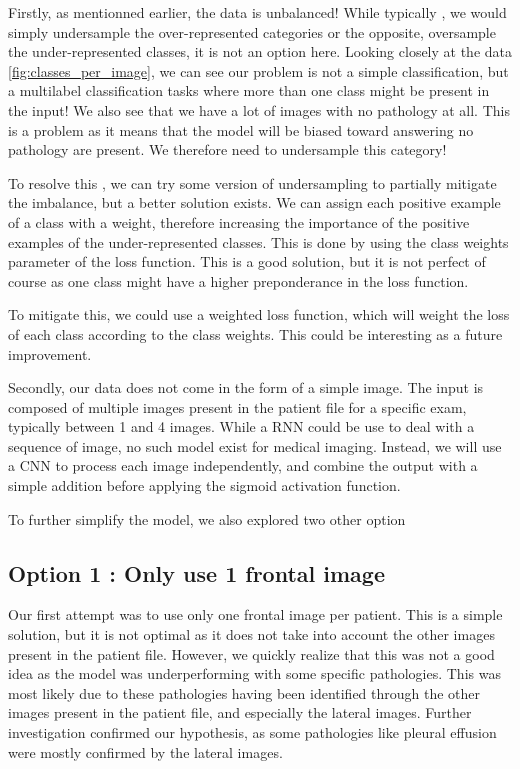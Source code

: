 \documentclass[11pt]{article}
\begin{document}
    Firstly, as mentionned earlier, the data is unbalanced! While typically , we would simply undersample the over-represented
    categories or the opposite, oversample the under-represented classes, it is not an option here. Looking closely at the data \ref{fig:classes_per_image},
    we can see our problem is not a simple classification, but a multilabel classification tasks where more than one class might be present
    in the input! We also see that we have a lot of images with no pathology at all. This is a problem as it means that the model will be biased toward answering no pathology are present. We therefore need to undersample this category!



    To resolve this , we can try some version of undersampling to partially mitigate the imbalance, but a better solution exists. We can assign each positive example
    of a class with a weight, therefore increasing the importance of the positive examples of the under-represented classes. This is
    done by using the class weights parameter of the loss function. This is a good solution, but it is not perfect of course as one class might have a higher preponderance in the loss
    function.

    To mitigate this, we could use a weighted loss function, which will weight the loss of each class according to the class weights. This could be interesting as a future improvement.


    Secondly, our data does not come in the form of a simple image. The input is composed of multiple images present in the patient file for a specific exam, typically between 1 and 4 images. While a RNN could be use to deal
    with a sequence of image, no such model exist for medical imaging. Instead, we will use a CNN to process each image independently, and combine the output with a simple addition before applying the sigmoid activation function.

    To further simplify the model, we also explored two other option

    \subsection{Option 1 : Only use 1 frontal image}
        Our first attempt was to use only one frontal image per patient. This is a simple solution, but it is not optimal as it does not take into account the other images present in the patient file.
        However, we quickly realize that this was not a good idea as the model was underperforming with some specific pathologies. This was most
        likely due to these pathologies having been identified through the other images present in the patient file, and especially the lateral images.
        Further investigation confirmed our hypothesis, as some pathologies like pleural effusion were mostly confirmed by the lateral images.
\end{document}
